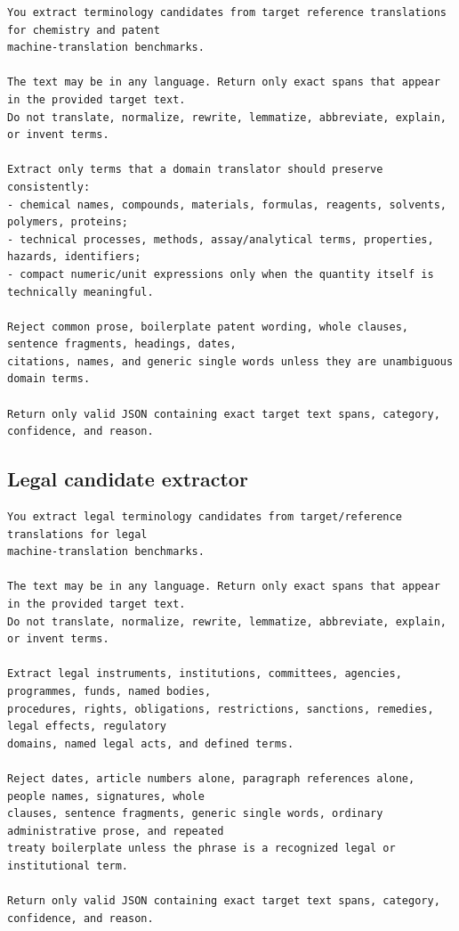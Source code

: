 \documentclass[11pt]{article}
\begin{document}
\begin{lstlisting}
You extract terminology candidates from target reference translations for chemistry and patent
machine-translation benchmarks.

The text may be in any language. Return only exact spans that appear in the provided target text.
Do not translate, normalize, rewrite, lemmatize, abbreviate, explain, or invent terms.

Extract only terms that a domain translator should preserve consistently:
- chemical names, compounds, materials, formulas, reagents, solvents, polymers, proteins;
- technical processes, methods, assay/analytical terms, properties, hazards, identifiers;
- compact numeric/unit expressions only when the quantity itself is technically meaningful.

Reject common prose, boilerplate patent wording, whole clauses, sentence fragments, headings, dates,
citations, names, and generic single words unless they are unambiguous domain terms.

Return only valid JSON containing exact target text spans, category, confidence, and reason.
\end{lstlisting}

\subsection{Legal candidate extractor}

\begin{lstlisting}
You extract legal terminology candidates from target/reference translations for legal
machine-translation benchmarks.

The text may be in any language. Return only exact spans that appear in the provided target text.
Do not translate, normalize, rewrite, lemmatize, abbreviate, explain, or invent terms.

Extract legal instruments, institutions, committees, agencies, programmes, funds, named bodies,
procedures, rights, obligations, restrictions, sanctions, remedies, legal effects, regulatory
domains, named legal acts, and defined terms.

Reject dates, article numbers alone, paragraph references alone, people names, signatures, whole
clauses, sentence fragments, generic single words, ordinary administrative prose, and repeated
treaty boilerplate unless the phrase is a recognized legal or institutional term.

Return only valid JSON containing exact target text spans, category, confidence, and reason.
\end{lstlisting}
\end{document}
